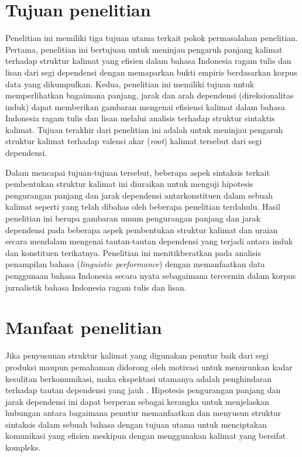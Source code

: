 \section{Tujuan penelitian}
Penelitian ini memiliki tiga tujuan utama terkait pokok permasalahan penelitian. Pertama, penelitian ini bertujuan untuk meninjau pengaruh panjang kalimat terhadap struktur kalimat yang efisien dalam bahasa Indonesia ragam tulis dan lisan dari segi dependensi dengan memaparkan bukti empiris berdasarkan korpus data yang dikumpulkan. Kedua, penelitian ini memiliki tujuan untuk memperlihatkan bagaimana panjang, jarak dan arah dependensi (direksionalitas induk) dapat memberikan gambaran mengenai efisiensi kalimat dalam bahasa Indonesia ragam tulis dan lisan melalui analisis terhadap struktur sintaktis kalimat. Tujuan terakhir dari penelitian ini adalah untuk meninjau pengaruh struktur kalimat terhadap valensi akar (\textit{root}) kalimat tersebut dari segi dependensi.

Dalam mencapai tujuan-tujuan tersebut, beberapa aspek sintaksis terkait pembentukan struktur kalimat ini diuraikan untuk menguji hipotesis pengurangan panjang dan jarak dependensi antarkonstituen dalam sebuah kalimat seperti yang telah dibahas oleh beberapa penelitian terdahulu. Hasil penelitian ini berupa gambaran umum pengurangan panjang dan jarak dependensi pada beberapa aspek pembentukan struktur kalimat dan uraian secara mendalam mengenai tautan-tautan dependensi yang terjadi antara induk dan konstituen terikatnya. Penelitian ini menitikberatkan pada analisis penampilan bahasa (\textit{linguistic performance}) dengan memanfaatkan data penggunaan bahasa Indonesia secara nyata sebagaimana tercermin dalam korpus jurnalistik bahasa Indonesia ragam tulis dan lisan.

\section{Manfaat penelitian}
Jika penyusunan struktur kalimat yang digunakan penutur baik dari segi produksi maupun pemahaman didorong oleh motivasi untuk menurunkan kadar kesulitan berkomunikasi, maka ekspektasi utamanya adalah penghindaran terhadap tautan dependensi yang jauh \citep{futrell2015large}. Hipotesis pengurangan panjang dan jarak dependensi ini dapat berperan sebagai kerangka untuk menjelaskan hubungan antara bagaimana penutur memanfaatkan dan menyusun struktur sintaksis dalam sebuah bahasa dengan tujuan utama untuk menciptakan komunikasi yang efisien meskipun dengan menggunakan kalimat yang bersifat kompleks.

